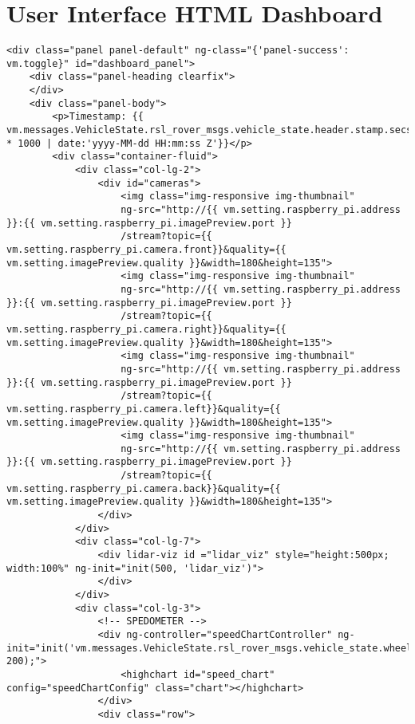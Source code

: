 \section{User Interface HTML Dashboard}
\begin{verbatim}
<div class="panel panel-default" ng-class="{'panel-success': vm.toggle}" id="dashboard_panel">
    <div class="panel-heading clearfix">
    </div>
    <div class="panel-body">
        <p>Timestamp: {{ vm.messages.VehicleState.rsl_rover_msgs.vehicle_state.header.stamp.secs * 1000 | date:'yyyy-MM-dd HH:mm:ss Z'}}</p>
        <div class="container-fluid">
            <div class="col-lg-2">
                <div id="cameras">
                    <img class="img-responsive img-thumbnail" 
                    ng-src="http://{{ vm.setting.raspberry_pi.address }}:{{ vm.setting.raspberry_pi.imagePreview.port }}
                    /stream?topic={{ vm.setting.raspberry_pi.camera.front}}&quality={{ vm.setting.imagePreview.quality }}&width=180&height=135">
                    <img class="img-responsive img-thumbnail" 
                    ng-src="http://{{ vm.setting.raspberry_pi.address }}:{{ vm.setting.raspberry_pi.imagePreview.port }}
                    /stream?topic={{ vm.setting.raspberry_pi.camera.right}}&quality={{ vm.setting.imagePreview.quality }}&width=180&height=135">
                    <img class="img-responsive img-thumbnail" 
                    ng-src="http://{{ vm.setting.raspberry_pi.address }}:{{ vm.setting.raspberry_pi.imagePreview.port }}
                    /stream?topic={{ vm.setting.raspberry_pi.camera.left}}&quality={{ vm.setting.imagePreview.quality }}&width=180&height=135">
                    <img class="img-responsive img-thumbnail" 
                    ng-src="http://{{ vm.setting.raspberry_pi.address }}:{{ vm.setting.raspberry_pi.imagePreview.port }}
                    /stream?topic={{ vm.setting.raspberry_pi.camera.back}}&quality={{ vm.setting.imagePreview.quality }}&width=180&height=135">
                </div>
            </div>
            <div class="col-lg-7">
                <div lidar-viz id ="lidar_viz" style="height:500px; width:100%" ng-init="init(500, 'lidar_viz')">
                </div>
            </div>
            <div class="col-lg-3">
                <!-- SPEDOMETER -->
                <div ng-controller="speedChartController" ng-init="init('vm.messages.VehicleState.rsl_rover_msgs.vehicle_state.wheel_speed', 200);">
                    <highchart id="speed_chart" config="speedChartConfig" class="chart"></highchart>
                </div>
                <div class="row">

\end{verbatim}
